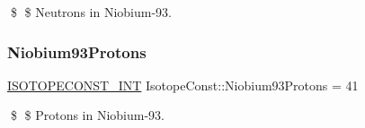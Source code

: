 \$ \$ Neutrons in Niobium-\/93. \mbox{\label{group___isotope_const-_niobium-_nb93_ga90e5fc6d270603d5df97601ff4f997b6}} 
\subsubsection{\texorpdfstring{Niobium93\+Protons}{Niobium93Protons}}
{\footnotesize\ttfamily \mbox{\hyperlink{group___isotope_const-_macros_ga5f18360b3e99483a35c32d789e62621c}{I\+S\+O\+T\+O\+P\+E\+C\+O\+N\+S\+T\+\_\+\+I\+NT}} Isotope\+Const\+::\+Niobium93\+Protons = 41}

\$ \$ Protons in Niobium-\/93. 
